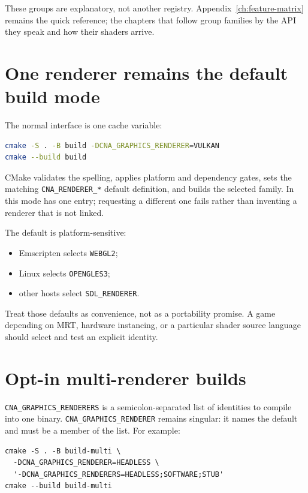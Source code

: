These groups are explanatory, not another registry. Appendix~\ref{ch:feature-matrix} remains the quick
reference; the chapters that follow group families by the API they speak and how their shaders
arrive.

\section{One renderer remains the default build mode}

The normal interface is one cache variable:

\begin{lstlisting}[language=bash]
cmake -S . -B build -DCNA_GRAPHICS_RENDERER=VULKAN
cmake --build build
\end{lstlisting}

CMake validates the spelling, applies platform and dependency gates, sets the matching
\texttt{CNA\_RENDERER\_*} default definition, and builds the selected family. In this mode
 has one entry; requesting a different one
fails rather than inventing a renderer that is not linked.

The default is platform-sensitive:

\begin{itemize}
  \item Emscripten selects \texttt{WEBGL2};
  \item Linux selects \texttt{OPENGLES3};
  \item other hosts select \texttt{SDL\_RENDERER}.
\end{itemize}

Treat those defaults as convenience, not as a portability promise. A game depending on MRT,
hardware instancing, or a particular shader source language should select and test an explicit
identity.

\section{Opt-in multi-renderer builds}

\texttt{CNA\_GRAPHICS\_RENDERERS} is a semicolon-separated list of identities to compile into
one binary. \texttt{CNA\_GRAPHICS\_RENDERER} remains singular: it names the default and must be a
member of the list. For example:

\begin{lstlisting}[style=cnashell]
cmake -S . -B build-multi \
  -DCNA_GRAPHICS_RENDERER=HEADLESS \
  '-DCNA_GRAPHICS_RENDERERS=HEADLESS;SOFTWARE;STUB'
cmake --build build-multi
\end{lstlisting}

